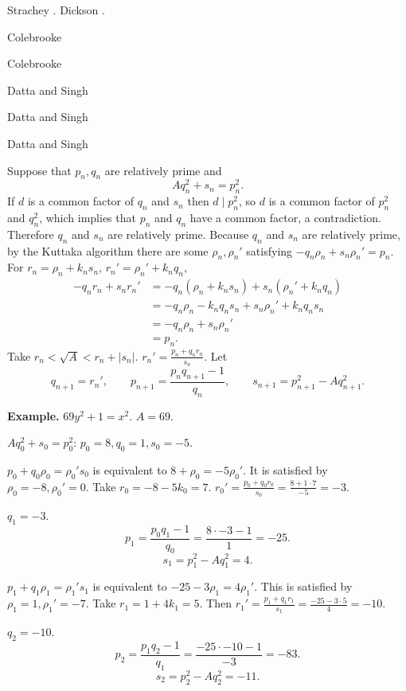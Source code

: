 \documentclass{article}
\theoremstyle{definition}
\begin{document}
Strachey \cite[pp.~36--53]{strachey}. Dickson \cite[pp.~349--350]{dicksonII}.

Colebrooke \cite[pp.~170--184]{colebrooke}

Colebrooke \cite[pp.~363--372]{colebrooke}

Datta and Singh \cite[II, pp.~93--99]{datta}

Datta and Singh \cite[II, pp.~146--161]{datta}

Datta and Singh \cite[II, pp.~161--172]{datta}

Suppose that $p_n,q_n$ are relatively prime and
\[
Aq_n^2+s_n=p_n^2.
\]
If $d$ is a common factor of $q_n$ and $s_n$ then $d \mid p_n^2$, so
$d$ is a common factor of $p_n^2$ and $q_n^2$,
which implies that $p_n$ and $q_n$ have a common factor, a contradiction.
Therefore $q_n$ and $s_n$ are relatively prime. 
Because $q_n$ and $s_n$ are relatively prime, 
by the Kuttaka algorithm
there are some $\rho_n,\rho_n'$ satisfying 
$-q_n \rho_n + s_n \rho_n' = p_n$.
For $r_n=\rho_n+k_n s_n$, $r_n'=\rho_n'+k_nq_n$,
\begin{align*}
-q_nr_n+s_nr_n'&=-q_n(\rho_n+k_ns_n)+s_n(\rho_n'+k_nq_n)\\
&= -q_n\rho_n-k_nq_ns_n+s_n\rho_n'+k_nq_ns_n\\
&=-q_n\rho_n+s_n\rho_n'\\
&=p_n.
\end{align*}
Take
$r_n<\sqrt{A}<r_n+|s_n|$.
$r_n' = \frac{p_n+q_nr_n}{s_n}$.
Let
\[
q_{n+1}=r_n', \qquad p_{n+1}=\frac{p_nq_{n+1}-1}{q_n},
\qquad
s_{n+1}=p_{n+1}^2-Aq_{n+1}^2.
\] 







\textbf{Example.}
$69y^2+1=x^2$.
$A=69$. 

$Aq_0^2+s_0=p_0^2$: $p_0=8, q_0=1, s_0=-5$. 

$p_0+q_0\rho_0=\rho_0's_0$ is equivalent to
$8+\rho_0=-5\rho_0'$. It is satisfied by 
$\rho_0=-8, \rho_0'=0$.
Take
$r_0=-8-5k_0= 7$.
$r_0'= \frac{p_0+q_0r_0}{s_0}
=\frac{8 +1 \cdot 7}{-5} = -3$. 

$q_1=-3$. 
\[
p_1 =\frac{p_0q_1-1}{q_0} = \frac{8 \cdot -3 - 1}{1} = -25.
\]
\[
s_1=p_1^2 - Aq_1^2 = 4.
\] 

$p_1+q_1\rho_1=\rho_1's_1$ is equivalent to
$-25 -3\rho_1 = 4\rho_1'$. This is satisfied
by $\rho_1=1, \rho_1'=-7$.
Take $r_1 =1+4k_1 = 5$.
Then
$r_1'=\frac{p_1+q_1r_1}{s_1} = \frac{-25 -3 \cdot 5}{4} = -10$. 

$q_2=-10$.
\[
p_2 = \frac{p_1q_2-1}{q_1} = \frac{-25 \cdot -10 - 1}{-3} = 
-83.
\]
\[
s_2 = p_2^2-Aq_2^2 = -11.
\]
\end{document}
